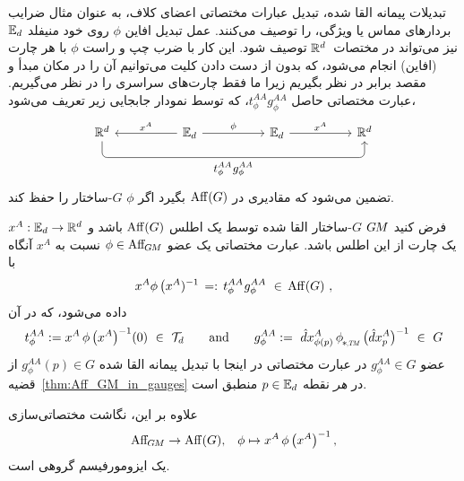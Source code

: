 تبدیلات پیمانه القا شده، تبدیل عبارات مختصاتی اعضای کلاف، به عنوان مثال ضرایب بردارهای مماس یا ویژگی، را توصیف می‌کنند.
عمل تبدیل افاین $\phi$ روی خود منیفلد $\mathbb{E}_d$ نیز می‌تواند در مختصات~$\mathbb{R}^d$ توصیف شود.
این کار با ضرب چپ و راست $\phi$ با هر چارت (افاین) انجام می‌شود، که بدون از دست دادن کلیت می‌توانیم آن را در مکان مبدأ و مقصد برابر در نظر بگیریم زیرا ما فقط چارت‌های سراسری را در نظر می‌گیریم.
عبارت مختصاتی حاصل $t_\phi^{AA} g_\phi^{AA}$، که توسط نمودار جابجایی زیر تعریف می‌شود،
\begin{equation}\label{cd:AffGM_in_chart}
	\begin{tikzcd}[row sep=2.5em, column sep=5em]
		\R^d
		\arrow[rrr, rounded corners, to path={
			|- node[below, pos=.75]{\small$t_\phi^{AA} \mkern1mu g_\phi^{AA}$} ([yshift=-3.ex, xshift=0ex]\tikztotarget.south)
			-- ([xshift=0ex]\tikztotarget.south)
		}]
		&
		\Euc_d
		\arrow[l, "{x^A}"']
		\arrow[r, "{\phi}"]
		&
		\Euc_d
		\arrow[r, "{x^A}"]
		&
		\R^d
	\end{tikzcd}
\end{equation}
تضمین می‌شود که مقادیری در $\operatorname{Aff}(G)$ بگیرد اگر $\phi$ $G$-ساختار را حفظ کند.
\begin{thm}
	\label{thm:Aff_GM_in_charts}
	فرض کنید $G\mkern-1.4muM$ $G$-ساختار القا شده توسط یک اطلس $\operatorname{Aff}(G)$ باشد و $x^A: \mathbb{E}_d \to \mathbb{R}^d$ یک چارت از این اطلس باشد.
	عبارت مختصاتی یک عضو $\phi \in \operatorname{Aff}_{\mkern-2muG\mkern-1.4muM}$ نسبت به $x^A$ آنگاه با
	\begin{align}\label{eq:AffGM_in_charts_eq}
		x^A \phi\, \big(x^A)^{-1} \,=:\, t_\phi^{AA} \mkern1mu g_\phi^{AA} \ \in\, \operatorname{Aff}(G) \ ,
	\end{align}
	داده می‌شود، که در آن
	\begin{align}
		t_\phi^{AA} := x^A \,\phi\, \big(x^A \big)^{-1} (0) \ \in\ \Trans_d
		\qquad \textup{and} \qquad
		g_\phi^{AA} := 
		\hat{d}x^A_{\phi(p)} \,\dphiTM\, \big(\hat{d}x^A_p \big)^{-1} \ \in\ G
	\end{align}
	عضو $g_\phi^{AA} \in G$ در عبارت مختصاتی در اینجا با تبدیل پیمانه القا شده $g_\phi^{AA}(p) \in G$ از قضیه~\ref{thm:Aff_GM_in_gauges} در \emph{هر} نقطه $p \in \mathbb{E}_d$ منطبق است.
	
	علاوه بر این، نگاشت مختصاتی‌سازی
	\begin{align}
		\operatorname{Aff}_{\mkern-2muG\mkern-1.4muM} \to \operatorname{Aff}(G),\,\ \ \phi \mapsto x^A \,\phi\, \big(x^A \big)^{-1} \,,
	\end{align}
	یک ایزومورفیسم گروهی است.
\end{thm}

